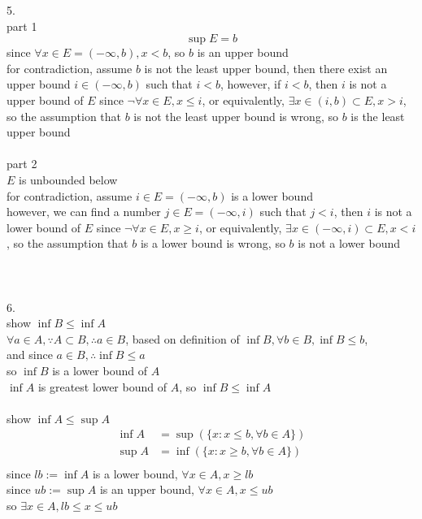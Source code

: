 \documentclass[12pt, border = 4pt, multi]{article} %
\begin{document}
5.\\
part 1
\[\sup E = b\]
since $\forall x \in E = (-\infty, b), x < b$, so $b$ is an upper bound\\
for contradiction, assume $b$ is not the least upper bound, then there exist an upper bound $i \in (-\infty, b)$ such that $i < b$, however, if $i < b$, then $i$ is not a upper bound of $E$ since $\neg\forall x \in E, x \leq i$, or equivalently, $\exists x \in (i, b) \subset E, x > i$, so the assumption that $b$ is not the least upper bound is wrong, so $b$ is the least upper bound\\
\\
part 2\\
$E$ is unbounded below\\
for contradiction, assume $i \in E = (-\infty, b)$ is a lower bound\\
however, we can find a number $j \in E = (-\infty, i)$ such that $j < i$, then $i$ is not a lower bound of $E$ since $\neg\forall x \in E, x \geq i$, or equivalently, $\exists x \in (-\infty, i) \subset E, x < i$, so the assumption that $b$ is a lower bound is wrong, so $b$ is not a lower bound\\
\\
\\
\\
6.\\
show $\inf B \leq \inf A$\\
$\forall a \in A, \because A \subset B, \therefore a \in B$, based on definition of $\inf B, \forall b \in B, \inf B \leq b$,\\
and since $a \in B, \therefore \inf B \leq a$\\
so $\inf B$ is a lower bound of $A$\\
$\inf A$ is greatest lower bound of $A$, so $\inf B \leq \inf A$\\
\\
show $\inf A \leq \sup A$\\
\begin{align*}
\inf A &= \sup(\{x : x \leq b, \forall b \in A\})\\
\sup A &= \inf(\{x: x \geq b, \forall b \in A\})\\
\end{align*}
since $lb := \inf A$ is a lower bound, $\forall x \in A, x \geq lb$\\
since $ub := \sup A$ is an upper bound, $\forall x \in A, x \leq ub$\\
so $\exists x \in A, lb \leq x \leq ub$\\
\end{document}
